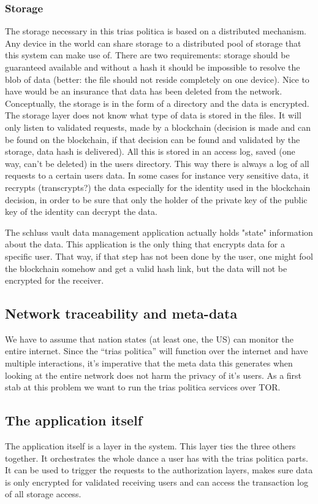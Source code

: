 \documentclass{article}
\begin{document}
\subsubsection{Storage}
The storage necessary in this trias politica is based on a distributed mechanism. Any device in the world can share storage to a distributed pool of storage that this system can make use of. There are two requirements: storage should be guaranteed available and without a hash it should be impossible to resolve the blob of data (better: the file should not reside completely on one device). Nice to have would be an insurance that data has been deleted from the network. Conceptually, the storage is in the form of a directory and the data is encrypted. The storage layer does not know what type of data is stored in the files. It will only listen to validated requests, made by a blockchain (decision is made and can be found on the blockchain, if that decision can be found and validated by the storage, data hash is delivered). All this is stored in an access log, saved (one way, can't be deleted) in the users directory. This way there is always a log of all requests to a certain users data. In some cases for instance very sensitive data, it recrypts (transcrypts?) the data especially for the identity used in the blockchain decision, in order to be sure that only the holder of the private key of the public key of the identity can decrypt the data.

The schluss vault data management application actually holds "state" information about the data. This application is the only thing that encrypts data for a specific user. That way, if that step has not been done by the user, one might fool the blockchain somehow and get a valid hash link, but the data will not be encrypted for the receiver.


\subsection{Network traceability and meta-data }
We have to assume that nation states (at least one, the US) can monitor the entire internet. Since the ``trias politica'' will function over the internet and have multiple interactions, it's imperative that the meta data this generates when looking at the entire network does not harm the privacy of it's users. As a first stab at this problem we want to run the trias politica services over TOR.

\subsection{The application itself}
The application itself is a layer in the system. This layer ties the three others together. It orchestrates the whole dance a user has with the trias politica parts. It can be used to trigger the requests to the authorization layers, makes sure data is only encrypted for validated receiving users and can access the transaction log of all storage access.
\end{document}
